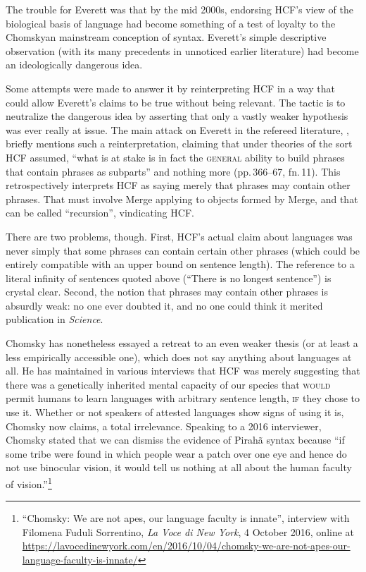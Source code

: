 \documentclass[output=paper,colorlinks,citecolor=brown
]{langscibook}
\begin{document}
The trouble for Everett was that by the mid 2000s, endorsing HCF's view
of the biological basis of language had become something of a test of
loyalty to the Chomskyan mainstream conception of syntax. Everett's
simple descriptive observation (with its many precedents in unnoticed
earlier literature) had become an ideologically dangerous idea.

Some attempts were made to answer it by reinterpreting HCF in a way
that could allow Everett's claims to be true without being relevant.
The tactic is to neutralize the dangerous idea by asserting that only
a vastly weaker hypothesis was ever really at issue. The main attack
on Everett in the refereed literature, \citet{NevPesRod09a}, briefly
mentions such a reinterpretation, claiming that under theories of the
sort HCF assumed, ``what is at stake is in fact the \textsc{general}
ability to build phrases that contain phrases as subparts'' and nothing
more (pp.\,366--67, fn.\,11). This retrospectively interprets HCF as
saying merely that phrases may contain other phrases. That must involve
Merge applying to objects formed by Merge, and that can be called
``recursion'', vindicating HCF.

There are two problems, though. First, HCF's actual claim about
languages was never simply that some phrases can contain certain other
phrases (which could be entirely compatible with an upper bound on
sentence length). The reference to a literal infinity of sentences
quoted above (``There is no longest sentence'') is crystal clear. Second,
the notion that phrases may contain other phrases is absurdly weak:
no one ever doubted it, and no one could think it merited publication
in \textit{Science}.

Chomsky has nonetheless essayed a retreat to an even weaker thesis
(or at least a less empirically accessible one), which does not say
anything about languages at all. He has maintained in various interviews
that HCF was merely suggesting that there was a genetically inherited
mental capacity of our species that \textsc{would} permit humans to
learn languages with arbitrary sentence length, \textsc{if} they chose
to use it. Whether or not speakers of attested languages show signs
of using it is, Chomsky now claims, a total irrelevance. Speaking to
a 2016 interviewer, Chomsky stated that we can dismiss the evidence of
Pirah{\~a} syntax because ``if some tribe were found in which people
wear a patch over one eye and hence do not use binocular vision, it
would tell us nothing at all about the human faculty of vision.''\footnote{%
   ``Chomsky: We are not apes, our language faculty is innate'', interview
   with Filomena Fuduli Sorrentino, \textit{La Voce di New York},
   4 October 2016, online at
   \url{https://lavocedinewyork.com/en/2016/10/04/chomsky-we-are-not-apes-our-language-faculty-is-innate/}}
\end{document}
